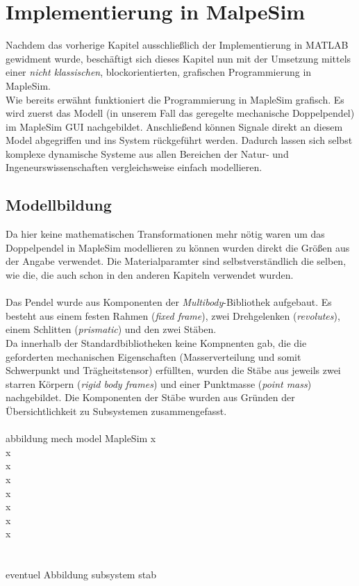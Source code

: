 \documentclass[a4paper, 10pt]{report}
\begin{document}
\renewcommand{\thechapter}{}
\chapter{Implementierung in MalpeSim}
\renewcommand{\thechapter}{4}
Nachdem das vorherige Kapitel ausschließlich der Implementierung in MATLAB gewidment wurde, beschäftigt sich dieses Kapitel nun mit der Umsetzung mittels einer \textit{nicht klassischen}, blockorientierten, grafischen Programmierung in MapleSim. \\
Wie bereits erwähnt funktioniert die Programmierung in MapleSim grafisch. Es wird zuerst das Modell (in unserem Fall das geregelte mechanische Doppelpendel) im MapleSim GUI nachgebildet. Anschließend können Signale direkt an diesem Model abgegriffen und ins System rückgeführt werden. Dadurch lassen sich selbst komplexe dynamische Systeme aus allen Bereichen der Natur- und Ingeneurswissenschaften vergleichsweise einfach modellieren.
\section{Modellbildung}
Da hier keine mathematischen Transformationen mehr nötig waren um das Doppelpendel in MapleSim modellieren zu können wurden direkt die Größen aus der Angabe verwendet. Die Materialparamter sind selbstverständlich die selben, wie die, die auch schon in den anderen Kapiteln verwendet wurden. 
\\\\
Das Pendel wurde aus Komponenten der \textit{Multibody}-Bibliothek aufgebaut. Es besteht aus einem festen Rahmen (\textit{fixed frame}), zwei Drehgelenken (\textit{revolutes}), einem Schlitten (\textit{prismatic}) und den zwei Stäben. \\
Da innerhalb der Standardbibliotheken keine Kompnenten gab, die die geforderten mechanischen Eigenschaften (Masserverteilung und somit Schwerpunkt und Trägheitstensor) erfüllten, wurden die Stäbe aus jeweils zwei starren Körpern (\textit{rigid body frames}) und einer Punktmasse (\textit{point mass}) nachgebildet. Die Komponenten der Stäbe wurden aus Gründen der Übersichtlichkeit zu Subsystemen zusammengefasst.
\\\\
abbildung mech model MapleSim
x\\x\\x\\x\\x\\x\\x\\x\\
\\\\
eventuel Abbildung subsystem stab
\end{document}
